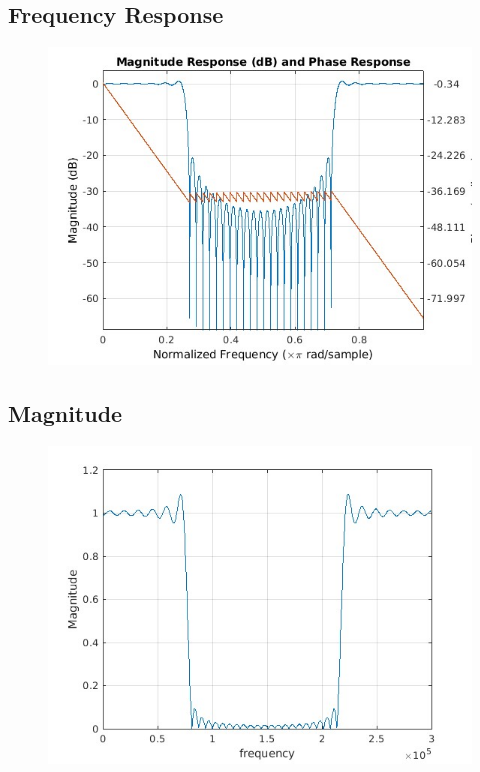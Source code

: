 \documentclass{article}
\begin{document}
\subsection{Frequency Response}
\begin{figure}[H]
\hspace*{-2.5cm}
    \centering
    \includegraphics[width=1.5\linewidth, height=0.65\textheight]{bandstop_freq.jpg}
    \label{fig:my_label}
\end{figure}

\subsection{Magnitude}
\begin{figure}[H]
\hspace*{-4cm}
    \centering
    \includegraphics[width=1.6\linewidth, height=0.65\textheight]{bandstop_mag.jpg}
    \label{fig:my_label}
\end{figure}
\end{document}
